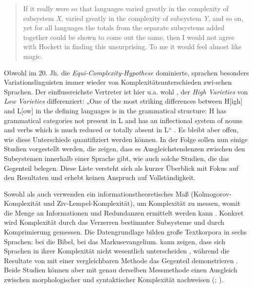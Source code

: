 \begin{quote}
If it really were so that languages varied greatly in the complexity of subsystem \textit{X}, varied greatly in the complexity of subsystem \textit{Y}, and so on, yet for all languages the totals from the separate subsystems added together could be shown to come out the same, then I would not agree with Hockett in finding this unsurprising. To me it would feel almost like magic. \citep[2--3]{Sampson2009}
\end{quote}

\noindent
Obwohl im 20. Jh. die \textit{Equi-Com\-ple\-xi\-ty-Hy\-po\-the\-se} dominierte, sprachen besonders Variationslinguisten immer wieder von Komplexitätsunterschieden zwi-\linebreak schen Sprachen. Der einflussreichste Vertreter ist hier u.a. wohl \citet{Ferguson1959}, der \textit{High Varieties} von \textit{Low Varieties} differenziert: „One of the most striking differences between H[igh] and L[ow] in the defining languages is in the grammatical structure: H has grammatical categories not present in L and has an inflectional system of nouns and verbs which is much reduced or totally absent in L“ \citep[333]{Ferguson1959}. Es bleibt aber offen, wie diese Unterschiede quantifiziert werden können. In der Folge sollen nun einige Studien vorgestellt werden, die zeigen, dass es Ausgleichstendenzen zwischen den Subsystemen innerhalb einer Sprache gibt, wie auch solche Studien, die das Gegenteil belegen. Diese Liste versteht sich als kurzer Überblick mit Fokus auf den Resultaten und erhebt keinen Anspruch auf Vollständigkeit.

Sowohl \citet{Juola2008} als auch \citet{EhretSzmrecsanyi2016} verwenden ein informationstheoretisches Maß (Kolmogorov-Komplexität und Ziv-Lem\-pel-Kom\-ple\-xi\-tät), um Komplexität zu messen, womit die Menge an Informationen und Redundanzen ermittelt werden kann \citep[93]{Juola2008}. Konkret wird Komplexität durch das Verzerren bestimmter Subsysteme und durch Komprimierung gemessen. Die Datengrundlage bilden große Textkorpora in sechs Sprachen: bei \citet{Juola2008} die Bibel, bei \citet{EhretSzmrecsanyi2016} das Markusevangelium. \citet{Juola2008} kann zeigen, dass sich Sprachen in ihrer Komplexität nicht wesentlich unterscheiden \citep[106]{Juola2008}, während die Resultate von \citet{EhretSzmrecsanyi2016} mit einer vergleichbaren Methode das Gegenteil demonstrieren \citep[78]{EhretSzmrecsanyi2016}. Beide Studien können aber mit genau derselben Messmethode einen Ausgleich zwischen morphologischer und syntaktischer Komplexität nachweisen (\citealt[104]{Juola2008}; \citealt[79--80]{EhretSzmrecsanyi2016}).

